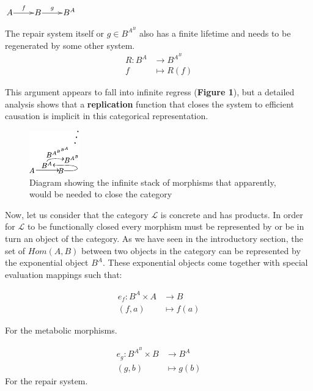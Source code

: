\documentclass[aps,twocolumn]{revtex4-1}
\begin{document}
\begin{center}
	$
	\xymatrix@1{
	A\ar[r]^f &B\ar[r]^-g & B^A}
	$
\end{center}


 The repair system itself or $g \in B^{A^B}$ also has a finite lifetime and needs to be regenerated by some other system.
 \begin{align*}
R: B^A & \longrightarrow B^{A^B}\\
f & \longmapsto R(f)
\end{align*}	

This argument appears to fall into infinite regress (\textbf{Figure 1}), but a detailed analysis shows that a \textbf{replication} function that closes the system to efficient causation is implicit in this categorical representation.

\begin{figure}
\noindent\includegraphics[width=0.45\columnwidth]{fig/mrcatinf.pdf}
\caption{Diagram showing the infinite stack of morphisms that apparently, would be needed to close the category}
\label{fig:hom}
\end{figure}

Now, let us consider that the category $\mathcal{L}$ is concrete and has products. In order for  $\mathcal{L}$  to be functionally closed every morphism must be represented by or be in turn an object of the category. As we have seen in the introductory section, the set of $Hom(A,B)$ between two objects in the category can be represented by the exponential object $B^A$. These exponential objects come together with special evaluation mappings such that:

\begin{align*}
e_f : B^A \times A &\longrightarrow B\\
(f,a) & \longmapsto f(a)
\end{align*}

For the metabolic morphisms.	
	
\begin{align*}
			e_g: B^{A^B} \times B &\longrightarrow B^A\\
	    			            (g,b) & \longmapsto    g(b)
			\end{align*}		
For the repair system.
\end{document}
